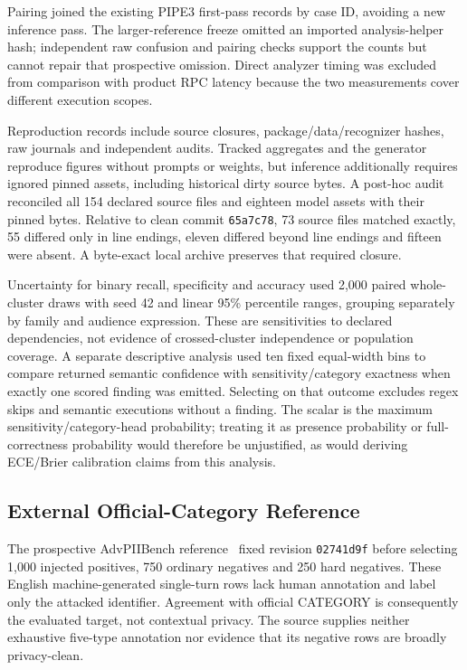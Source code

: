 \documentclass[conference]{IEEEtran}
\begin{document}
Pairing joined the existing PIPE3 first-pass records by case ID, avoiding a new inference pass. The larger-reference freeze omitted an imported analysis-helper hash; independent raw confusion and pairing checks support the counts but cannot repair that prospective omission. Direct analyzer timing was excluded from comparison with product RPC latency because the two measurements cover different execution scopes.

Reproduction records include source closures, package/data/recognizer hashes, raw journals and independent audits. Tracked aggregates and the generator reproduce figures without prompts or weights, but inference additionally requires ignored pinned assets, including historical dirty source bytes. A post-hoc audit reconciled all 154 declared source files and eighteen model assets with their pinned bytes. Relative to clean commit \texttt{65a7c78}, 73 source files matched exactly, 55 differed only in line endings, eleven differed beyond line endings and fifteen were absent. A byte-exact local archive preserves that required closure.

Uncertainty for binary recall, specificity and accuracy used 2,000 paired whole-cluster draws with seed 42 and linear 95\% percentile ranges, grouping separately by family and audience expression. These are sensitivities to declared dependencies, not evidence of crossed-cluster independence or population coverage. A separate descriptive analysis used ten fixed equal-width bins to compare returned semantic confidence with sensitivity/category exactness when exactly one scored finding was emitted. Selecting on that outcome excludes regex skips and semantic executions without a finding. The scalar is the maximum sensitivity/category-head probability; treating it as presence probability or full-correctness probability would therefore be unjustified, as would deriving ECE/Brier calibration claims from this analysis.

\subsection{External Official-Category Reference}
The prospective AdvPIIBench reference~\cite{arpaly2026advpiibench} fixed revision \texttt{02741d9f} before selecting 1,000 injected positives, 750 ordinary negatives and 250 hard negatives. These English machine-generated single-turn rows lack human annotation and label only the attacked identifier. Agreement with official CATEGORY is consequently the evaluated target, not contextual privacy. The source supplies neither exhaustive five-type annotation nor evidence that its negative rows are broadly privacy-clean.
\end{document}
